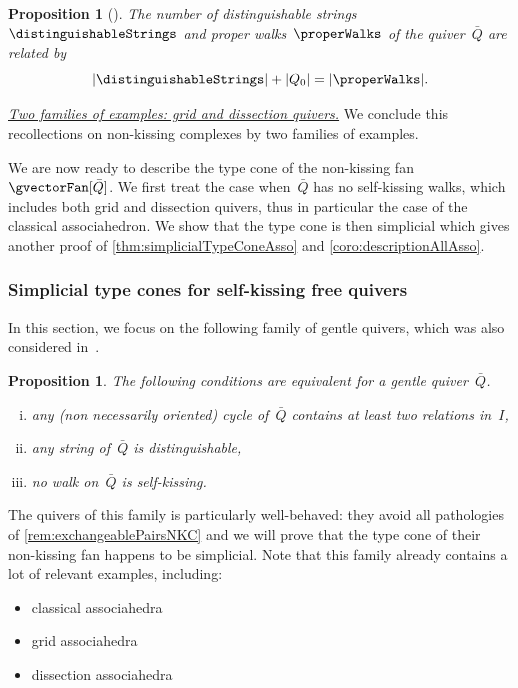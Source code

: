 \documentclass{amsart}
\newtheorem{proposition}[theorem]{Proposition}
\theoremstyle{definition}
\newcommand{\para}[1]{\medskip\noindent\uline{\textit{#1.}}} %
\newcommand{\vincent}[1]{\todo[color=blue!30]{#1 \\ \hfill --- V.}}
\newcommand{\quiver}{\bar Q} %
\begin{document}
\begin{proposition}[{\cite[3.68]{PaluPilaudPlamondon-nonkissing}}]
\label{prop:bijectionStringsWalks}
The number of distinguishable strings~$\distinguishableStrings$ and proper walks~$\properWalks$ of the quiver~$\quiver$ are related by
\[
|\distinguishableStrings| + |Q_0| = |\properWalks|.
\]
\end{proposition}

\para{Two families of examples: grid and dissection quivers}
%
We conclude this recollections on non-kissing complexes by two families of examples.
\vincent{TODO}

\bigskip
We are now ready to describe the type cone of the non-kissing fan~$\gvectorFan[\quiver]$.
We first treat the case when~$\quiver$ has no self-kissing walks, which includes both grid and dissection quivers, thus in particular the case of the classical associahedron.
We show that the type cone is then simplicial which gives another proof of \cref{thm:simplicialTypeConeAsso} and \cref{coro:descriptionAllAsso}.

\subsubsection{Simplicial type cones for self-kissing free quivers}

In this section, we focus on the following family of gentle quivers, which was also considered in~\cite[Sect.~4]{}.

\begin{proposition}
\label{prop:noSelfKissing}
The following conditions are equivalent for a gentle quiver~$\quiver$.
\begin{enumerate}[(i)]
\item any (non necessarily oriented) cycle of~$\quiver$ contains at least two relations in~$I$,
\item any string of~$\quiver$ is distinguishable,
\item no walk on~$\quiver$ is self-kissing.
\end{enumerate}
\end{proposition}

The quivers of this family is particularly well-behaved: they avoid all pathologies of \cref{rem:exchangeablePairsNKC} and we will prove that the type cone of their non-kissing fan happens to be simplicial.
Note that this family already contains a lot of relevant examples, including:
\begin{itemize}
\item classical associahedra
\item grid associahedra
\item dissection associahedra
\end{itemize}
\vincent{More explicit. TODO}
\end{document}
